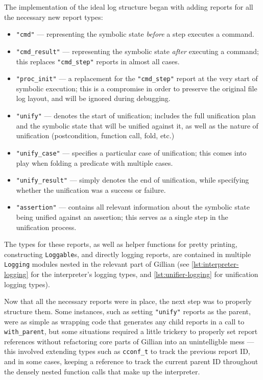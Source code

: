 The implementation of the ideal log structure began with adding reports for
all the necessary new report types:
\begin{itemize}
  \item \texttt{"cmd"} --- representing the symbolic state \textit{before} a
        step executes a command.
  \item \texttt{"cmd\_result"} --- representing the symbolic state
        \textit{after} executing a command; this replaces \texttt{"cmd\_step"}
        reports in almost all cases.
  \item \texttt{"proc\_init"} --- a replacement for the \texttt{"cmd\_step"}
        report at the very start of symbolic execution; this is a compromise
        in order to preserve the original file log layout, and will be ignored
        during debugging.
  \item \texttt{"unify"} --- denotes the start of unification; includes the
        full unification plan and the symbolic state that will be unified
        against it, as well as the nature of unification (postcondition,
        function call, fold, etc.)
  \item \texttt{"unify\_case"} --- specifies a particular case of unification;
        this comes into play when folding a predicate with multiple cases.
  \item \texttt{"unify\_result"} --- simply denotes the end of unification,
        while specifying whether the unification was a success or failure.
  \item \texttt{"assertion"} --- contains all relevant information about the
        symbolic state being unified against an assertion; this serves as a
        single step in the unification process.
\end{itemize}

The types for these reports, as well as helper functions for pretty printing,
constructing \texttt{Loggable}s, and directly logging reports, are contained
in multiple \texttt{Logging} modules nested in the relevant part of Gillian
(see \autoref{lst:interpreter-logging} for the interpreter's logging types, and
\autoref{lst:unifier-logging} for unification logging types).

Now that all the necessary reports were in place, the next step was to properly
structure them. Some instances, such as setting \texttt{"unify"} reports as the
parent, were as simple as wrapping code that generates any child reports in a
call to \texttt{with\_parent}, but some situations required a little trickery
to properly set report references without refactoring core parts of Gillian into
an unintelligble mess --- this involved extending types such as
\texttt{cconf\_t} to track the previous report ID, and in some cases, keeping a
reference to track the current parent ID throughout the densely nested function
calls that make up the interpreter.

